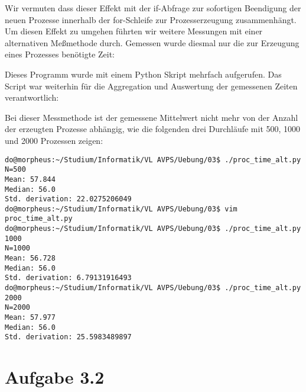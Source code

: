 \documentclass{scrartcl}
\begin{document}
Wir vermuten dass dieser Effekt mit der if-Abfrage zur sofortigen Beendigung der neuen Prozesse innerhalb der for-Schleife zur Prozesserzeugung zusammenhängt. %
Um diesen Effekt zu umgehen führten wir weitere Messungen mit einer alternativen Meßmethode durch. Gemessen wurde diesmal nur die zur Erzeugung eines Prozesses benötigte Zeit:



Dieses Programm wurde mit einem Python Skript mehrfach aufgerufen. Das Script war weiterhin für die Aggregation und Auswertung der gemessenen Zeiten verantwortlich:



Bei dieser Messmethode ist der gemessene Mittelwert nicht mehr von der Anzahl der erzeugten Prozesse abhängig, wie die folgenden drei Durchläufe mit 500, 1000 und 2000 Prozessen zeigen:

\begin{verbatim}
do@morpheus:~/Studium/Informatik/VL AVPS/Uebung/03$ ./proc_time_alt.py
N=500
Mean: 57.844
Median: 56.0
Std. derivation: 22.0275206049
do@morpheus:~/Studium/Informatik/VL AVPS/Uebung/03$ vim proc_time_alt.py 
do@morpheus:~/Studium/Informatik/VL AVPS/Uebung/03$ ./proc_time_alt.py 1000
N=1000
Mean: 56.728
Median: 56.0
Std. derivation: 6.79131916493
do@morpheus:~/Studium/Informatik/VL AVPS/Uebung/03$ ./proc_time_alt.py 2000
N=2000
Mean: 57.977
Median: 56.0
Std. derivation: 25.5983489897
\end{verbatim}

\section*{Aufgabe 3.2}
\end{document}
